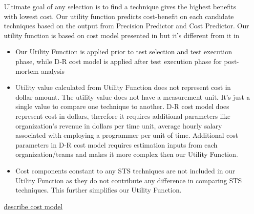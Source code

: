 Ultimate goal of any selection is to find a technique gives the highest
benefits with lowest cost. Our utility function predicts cost-benefit on each candidate
techniques based on the output from Precision Predictor and Cost Predictor. Our
utility function is based on cost model presented in 
\cite{DBLP:conf/sigsoft/DoR06} but it's different from it in  
\begin{itemize}
  \item Our Utility Function is applied prior to test selection and test
  execution phase, while D-R cost model is applied after test
  execution phase for post-mortem analysis
  \item Utility value calculated from Utility Function does not represent cost
  in dollar amount. The utility value does not have a measurement unit. It's
  just a single value to compare one technique to another. D-R cost model does
  represent cost in dollars, therefore it requires additional parameters like
  organization's revenue in dollars per time unit, average hourly salary
  associated with employing a programmer per unit of time. Additional cost
  parameters in D-R cost model requires estimation inputs from
  each organization/teams and makes it more complex then our Utility Function.
  \item Cost components constant to any STS techniques are not included in our
  Utility Function as they do not contribute any difference in comparing STS
  techniques. This further simplifies our Utility Function. 
\end{itemize} 

\underline{describe cost model}
